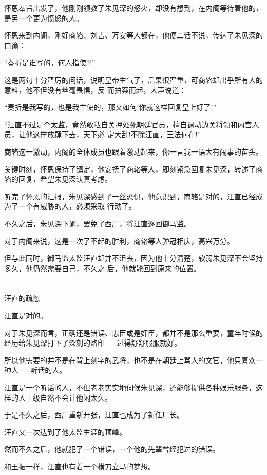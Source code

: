 \documentclass[11pt,a4paper,onecolumn]{article}
\begin{document}
怀恩奉旨出发了，他刚刚领教了朱见深的怒火，却没有想到，在内阁等待着他的，是另一个更为愤怒的人。

怀恩来到内阁，刚好商辂、刘吉、万安等人都在，他便二话不说，传达了朱见深的口谕：

``奏折是谁写的，何人指使?!''

这是两句十分严厉的问话，说明皇帝生气了，后果很严重，可商辂却出乎所有人的意料，他不但没有丝毫畏惧，反
而拍案而起，大声说道：

``奏折是我写的，也是我主使的，那又如何!你就这样回复皇上好了!''

``汪直不过是个太监，竟然敢私自关押处死朝廷官员，擅自调动边关将领和内宫人员，让他这样放肆下去，天下必
定大乱!不除汪直，王法何在!''

商辂这一激动，内阁的全体成员也跟着激动起来，你一言我一语大有闹事的苗头。

关键时刻，怀恩保持了镇定，他安抚了商辂等人，即刻紧急回复朱见深，转述了商辂的回复，希望朱见深认真考虑。

听完了怀恩的汇报，朱见深感到了一丝恐惧，他意识到，商辂是对的，汪直已经成为了一个有威胁的人，必须采取
行动了。

不久之后，朱见深下谕，罢免了西厂，将汪直逐回御马监。

对于内阁来说，这是一次了不起的胜利，商辂等人弹冠相庆，高兴万分。

但与此同时，御马监太监汪直却并不沮丧，因为他十分清楚，软弱朱见深不会坚持多久，他仍然需要自己，不久之
后，他就能回到原来的位置。

\section[\thesection]{}

汪直的疏忽

汪直是对的。

对于朱见深而言，正确还是错误、忠臣或是奸臣，都并不是那么重要，童年时候的经历给朱见深打下了深刻的烙印
--- 过得舒舒服服就好。

所以他需要的并不是在背上刻字的武将，也不是在朝廷上骂人的文官，他只喜欢一种人 --- 听话的人。

汪直是一个听话的人，不但老老实实地伺候朱见深，还能够提供各种娱乐服务，这样的人上级自然不会让他闲太久。

于是不久之后，西厂重新开张，汪直也成为了新任厂长。

汪直又一次达到了他太监生涯的顶峰。

然而不久之后，他就犯了一个错误，一个他的先辈曾经犯过的错误。

和王振一样，汪直也有着一个横刀立马的梦想。
\end{document}
